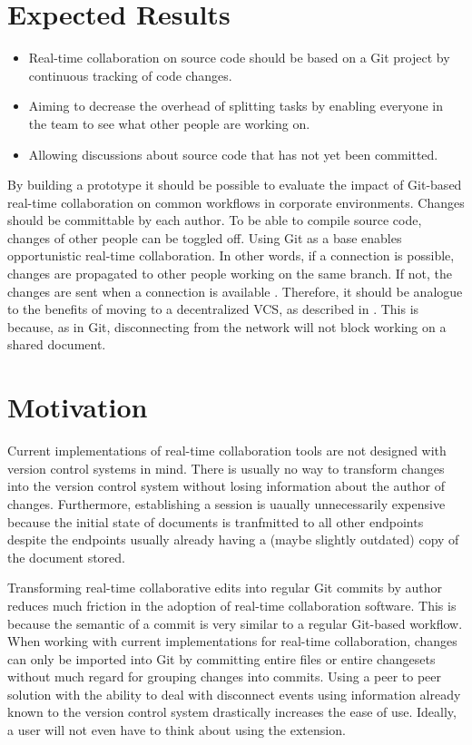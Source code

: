 \section{Expected Results}

\begin{itemize}
    \item Real-time collaboration on source code should be based on a Git project by
    continuous tracking of code changes.
    \item Aiming to decrease the overhead of splitting tasks by enabling everyone in the team to see what other people are working on. 
    \item Allowing discussions about source code that has not yet been committed.
\end{itemize}

By building a prototype it should be possible to evaluate the impact of Git-based real-time collaboration on common workflows in corporate environments.
Changes should be committable by each author. To be able to compile source code, changes of other people can be toggled off.
Using Git as a base enables opportunistic real-time collaboration. In other words, if a connection is possible, changes are propagated  to other people working on the same branch. If not, the changes are sent when a connection is available \cite{6188603}. Therefore, it should be analogue to the benefits of moving to a decentralized VCS, as described in \cite{AlwisSillito:2009:centralToDecentralVCS}. This is because, as in Git, disconnecting from the network will not block working on a shared document.

\section{Motivation}

Current implementations of real-time collaboration tools are not designed with version control systems in mind. There is usually no way to transform changes into the version control system without losing information about the author of changes. Furthermore, establishing a session is uaually unnecessarily expensive because the initial state of documents is tranfmitted to all other endpoints despite the endpoints usually already having a (maybe slightly outdated) copy of the document stored.

Transforming real-time collaborative edits into regular Git commits by author reduces much friction in the adoption of real-time collaboration software. This is because the semantic of a commit is very similar to a regular Git-based workflow. When working with current implementations for real-time collaboration, changes can only be imported into Git by committing entire files or entire changesets without much regard for grouping changes into commits. Using a peer to peer solution with the ability to deal with disconnect events using information already known to the version control system drastically increases the ease of use. Ideally, a user will not even have to think about using the extension.